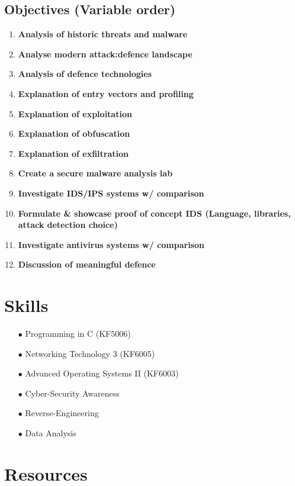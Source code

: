 \subsection{Objectives (Variable order)}
\begin{enumerate}
	\item \textbf{Analysis of historic threats and malware}\label{talkHistory}
	\item \textbf{Analyse modern attack:defence landscape}\label{talkModern}
	\item \textbf{Analysis of defence technologies}\label{talkDefenceTech}
	\item \textbf{Explanation of entry vectors and profiling}\label{talkEntryVectors}
	\item \textbf{Explanation of exploitation}\label{talkExploitation}
	\item \textbf{Explanation of obfuscation}\label{talkObfuscation}
	\item \textbf{Explanation of exfiltration}\label{talkExfil}
	\item \textbf{Create a secure malware analysis lab}\label{makeLab}
	\item \textbf{Investigate IDS/IPS systems w/ comparison}\label{compareIDPS}
	\item \textbf{Formulate & showcase proof of concept IDS (Language, libraries, attack detection choice)}\label{write-code}
	\item \textbf{Investigate antivirus systems w/ comparison}\label{compareAV}
	\item \textbf{Discussion of meaningful defence}\label{talkDefenceInDepth}
\end{enumerate}

\section{Skills}
\begin{enumerate}
	\item [$\bullet$] Programming in C (KF5006)
	\item [$\bullet$] Networking Technology 3 (KF6005)
	\item [$\bullet$] Advanced Operating Systems II (KF6003)
	\item [$\bullet$] Cyber-Security Awareness
	\item [$\bullet$] Reverse-Engineering
	\item [$\bullet$] Data Analysis
\end{enumerate}

\section{Resources}
